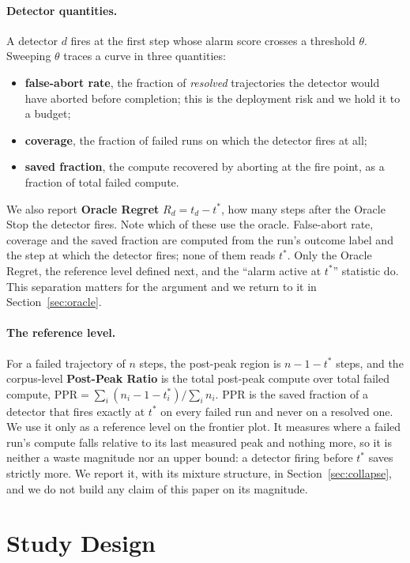 \documentclass[sigconf,screen]{acmart}
\begin{document}
\paragraph{Detector quantities.} A detector $d$ fires at the first step whose alarm score crosses a
threshold $\theta$. Sweeping $\theta$ traces a curve in three quantities:
\begin{itemize}
\item \textbf{false-abort rate}, the fraction of \emph{resolved} trajectories the detector would
have aborted before completion; this is the deployment risk and we hold it to a budget;
\item \textbf{coverage}, the fraction of failed runs on which the detector fires at all;
\item \textbf{saved fraction}, the compute recovered by aborting at the fire point, as a fraction
of total failed compute.
\end{itemize}
We also report \textbf{Oracle Regret} $R_d = t_d - t^{*}$, how many steps after the Oracle Stop the
detector fires. Note which of these use the oracle. False-abort rate, coverage and the saved
fraction are computed from the run's outcome label and the step at which the detector fires; none
of them reads $t^{*}$. Only the Oracle Regret, the reference level defined next, and the ``alarm
active at $t^{*}$'' statistic do. This separation matters for the argument and we return to it in
Section~\ref{sec:oracle}.

\paragraph{The reference level.} For a failed trajectory of $n$ steps, the post-peak region is
$n-1-t^{*}$ steps, and the corpus-level \textbf{Post-Peak Ratio} is the total post-peak compute over
total failed compute, $\mathrm{PPR} = \sum_i (n_i - 1 - t^{*}_i) / \sum_i n_i$. PPR is the saved
fraction of a detector that fires exactly at $t^{*}$ on every failed run and never on a resolved
one. We use it only as a reference level on the frontier plot. It measures where a failed run's
compute falls relative to its last measured peak and nothing more, so it is neither a waste
magnitude nor an upper bound: a detector firing before $t^{*}$ saves strictly more. We report it, with its
mixture structure, in Section~\ref{sec:collapse}, and we do not build any claim of this paper on
its magnitude.

\section{Study Design}
\label{sec:design}
\end{document}
